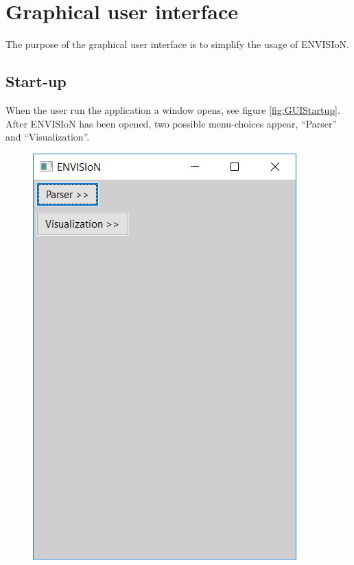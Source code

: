 \section{Graphical user interface}
The purpose of the graphical user interface is to simplify the usage of ENVISIoN. 

\subsection{Start-up}
When the user run the application a window opens, see figure \ref{fig:GUIStartup}. After ENVISIoN has been opened, two possible menu-choices appear, ``Parser'' and ``Visualization''.

\begin{figure}[ht]
    \centering
    \includegraphics[angle=0,scale=0.5]{images/GUIBasWin.png}

\end{figure}
